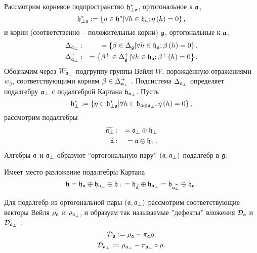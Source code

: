 Рассмотрим корневое подпространство $\mathfrak{h}_{\perp \mathfrak{a}}^{\ast }$, ортогональное к  $\mathfrak{a}$,
\begin{equation*}
\mathfrak{h}_{\perp \mathfrak{a}}^{\ast }:=\left\{ \eta \in \mathfrak{h}^{\ast }
|\forall h \in \mathfrak{h}_{\mathfrak{a}};  \eta\left(h \right)=0 \right\} ,
\end{equation*}
и корни (соответственно -- положительные корни)  $\mathfrak{g}$, ортогональные
к $\mathfrak{a}$,
\begin{eqnarray*}
\Delta _{\af_{\perp }} &:&=\left\{ \beta \in \Delta _{\gf}|
\forall h \in \hf_{\af};  \beta\left(h \right)=0  \right\} , \\
\Delta _{\af_{\perp }}^{+} &:&=\left\{ \beta ^{+}\in \Delta _{\gf%
}^{+}|\forall h \in \hf_{\af};  \beta^{+}\left(h \right)=0  \right\} .
\end{eqnarray*}
Обозначим через $W_{\mathfrak{a}_{\perp}}$ подгруппу группы Вейля $W$, порожденную отражениями $w _{\beta }$, соответствующими корням $\beta \in \Delta _{\mathfrak{a}_{\perp}}^{+}$ . Подсистема  $\Delta _{\mathfrak{a}_{\perp }}$ определяет подалгебру $\mathfrak{a}_{\perp }$ с подалгеброй Картана $\mathfrak{h}_{\mathfrak{a}_{\perp}}$. Пусть
\begin{equation*}
\mathfrak{h}_{\perp }^{\ast }:=\left\{ \eta \in \mathfrak{h}_{\perp \mathfrak{a}}^{\ast
}|\forall h \in \mathfrak{h}_{\mathfrak{a}\oplus \mathfrak{a}_{\perp}}; \eta \left( h \right)=0 \right\},
\end{equation*}
рассмотрим подалгебры
\begin{eqnarray*}
\widetilde{\mathfrak{a}_{\perp }} &:&=\mathfrak{a}_{\perp }\oplus \mathfrak{h}_{\perp }
\\
\widetilde{\mathfrak{a}} &:&=\mathfrak{a}\oplus \mathfrak{h}_{\perp }.
\end{eqnarray*}
Алгебры $\mathfrak{a}$ и $\mathfrak{a}_{\perp }$ образуют ''ортогональную пару''
$\left( \mathfrak{a},\mathfrak{a}_{\perp}\right)$ подалгебр в  $\mathfrak{g}$.

Имеет место разложение подалгебры Картана
\begin{equation}
\hf=\frak{\hf_{\af}}\oplus \hf_{\af_{\perp }}\oplus
\hf_{\perp }=\frak{\hf_{\widetilde{\af}}}\oplus \hf_{%
\af_{\perp }}=\frak{\hf_{\widetilde{\af_{\perp }}}}\oplus
\hf_{\af}.
\end{equation}

Для подалгебр из ортогональной пары  $\left( \mathfrak{a},\mathfrak{a}_{\perp}\right) $ рассмотрим соответствующие векторы Вейля $\rho _{\mathfrak{a}}$ и $\rho _{\mathfrak{a}_{\perp }}$, и образуем так называемые  ''дефекты'' вложения $\mathcal{D}_{\mathfrak{a}}$ и $\mathcal{D}_{\mathfrak{a}_{\perp }}$ :
\begin{equation}
\mathcal{D}_{\mathfrak{a}}:=\rho _{\mathfrak{a}}-\pi _{\mathfrak{a}}\rho ,
\end{equation}
\begin{equation}
\label{defect-perp}
\mathcal{D}_{\af_{\perp }}:=\rho _{\af_{\perp }}-\pi _{\af%
_{\perp }}\circ\rho .
\end{equation}

